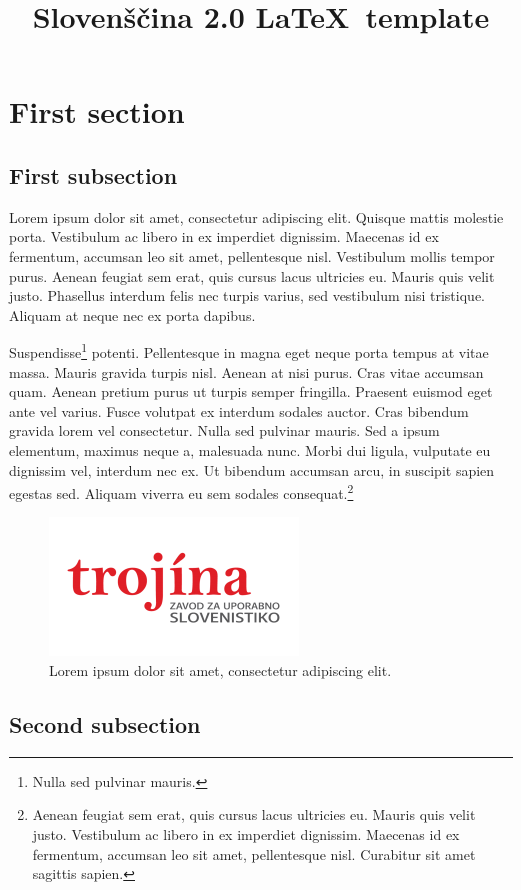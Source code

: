\documentclass[english,slovene]{slo20}
\affiliation{%
Magic and Macaroons Lab, University of Southern Atlantis\\
The Republic, Utopia}
\affiliation{%
ACME Research Group, University of Entenhausen\\
Entenhausen, Germany}
\title{Slovenščina 2.0 \LaTeX\ template}
\begin{document}
\section{First section}

\subsection{First subsection}

Lorem ipsum dolor sit amet, consectetur adipiscing elit. Quisque mattis
molestie porta. Vestibulum ac libero in ex imperdiet dignissim. Maecenas
id ex fermentum, accumsan leo sit amet, pellentesque nisl. Vestibulum
mollis tempor purus. Aenean feugiat sem erat, quis cursus lacus ultricies
eu. Mauris quis velit justo. Phasellus interdum felis nec turpis varius,
sed vestibulum nisi tristique. Aliquam at neque nec ex porta dapibus.

Suspendisse\footnote{ Nulla sed pulvinar mauris.} potenti. Pellentesque in
magna eget neque porta tempus at vitae massa. Mauris gravida turpis nisl.
Aenean at nisi purus. Cras vitae accumsan quam. Aenean pretium purus ut
turpis semper fringilla. Praesent euismod eget ante vel varius. Fusce
volutpat ex interdum sodales auctor.  Cras bibendum gravida lorem vel
consectetur. Nulla sed pulvinar mauris.  Sed a ipsum elementum, maximus
neque a, malesuada nunc. Morbi dui ligula, vulputate eu dignissim vel,
interdum nec ex. Ut bibendum accumsan arcu, in suscipit sapien egestas
sed. Aliquam viverra eu sem sodales consequat.\footnote{Aenean feugiat sem
erat, quis cursus lacus ultricies eu. Mauris quis velit justo. Vestibulum
ac libero in ex imperdiet dignissim. Maecenas id ex fermentum, accumsan
leo sit amet, pellentesque nisl. Curabitur sit amet sagittis sapien.}

\begin{figure}
\centering
\includegraphics[scale=0.75]{trojina}
\caption{%
Lorem ipsum dolor sit amet, consectetur adipiscing elit.}
\end{figure}

\subsection{Second subsection}
\end{document}
